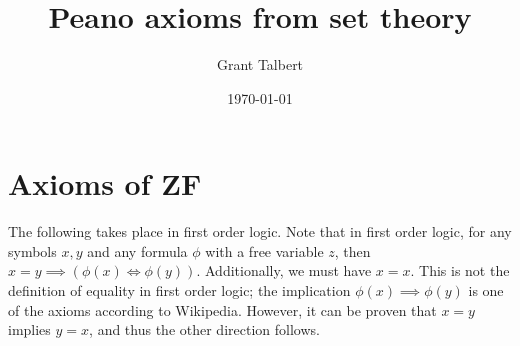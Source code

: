 \documentclass{article}
\title{Peano axioms from set theory}
\author{Grant Talbert}
\date{\today}
\begin{document}
\maketitle

\section{Axioms of ZF}

The following takes place in first order logic. Note that in first order logic, for any symbols $x,y$ and any formula $\phi $ with a free variable $z$, then $x=y \implies (\phi (x) \iff \phi (y))$. Additionally, we must have $x=x$. This is not the definition of equality in first order logic; the implication $\phi (x) \implies \phi (y)$ is one of the axioms according to Wikipedia. However, it can be proven that $x=y$ implies $y=x$, and thus the other direction follows.
\end{document}
